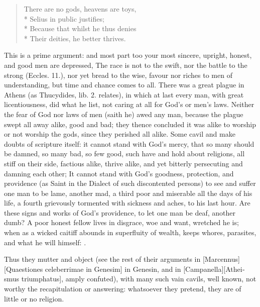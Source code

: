 {\begin{verse}
There are no gods, heavens are toys,\\*
Selius in public justifies;\\*
Because that whilst he thus denies\\*
Their deities, he better thrives.
\end{verse}

This is a prime argument: and most part too your most sincere, upright,
honest, and good men are depressed, The race is not to the swift,
nor the battle to the strong (Eccles.  11.), nor yet bread to the
wise, favour nor riches to men of understanding, but time and chance
comes to all. There was a great plague in Athens (as Thucydides, lib.
2. relates), in which at last every man, with great licentiousness, did
what he list, not caring at all for God's or men's laws. Neither the
fear of God nor laws of men (saith he) awed any man, because the plague
swept all away alike, good and bad; they thence concluded it was alike
to worship or not worship the gods, since they perished all alike. Some
cavil and make doubts of scripture itself: it cannot stand with God's
mercy, that so many should be damned, so many bad, so few good, such
have and hold about religions, all stiff on their side, factious alike,
thrive alike, and yet bitterly persecuting and damning each other; It
cannot stand with God's goodness, protection, and providence (as
Saint \Chrysostom{} in the Dialect of such discontented persons) to
see and suffer one man to be lame, another mad, a third poor and
miserable all the days of his life, a fourth grievously tormented with
sickness and aches, to his last hour. Are these signs and works of
God's providence, to let one man be deaf, another dumb? A poor honest
fellow lives in disgrace, woe and want, wretched he is; when as a
wicked caitiff abounds in superfluity of wealth, keeps whores,
parasites, and what he will himself: .

Thus they mutter and object (see the rest of their
arguments in [Marcennus][\textlatin{Quaestiones celeberrimae in Genesim}] in Genesin, and in [Campanella][\textlatin{Atheismus triumphatus}], amply confuted),
with many such vain cavils, well known, not worthy the recapitulation
or answering: whatsoever they pretend, they are  of little or no
religion.

}
